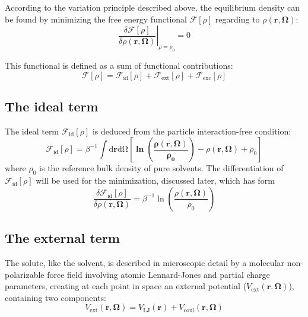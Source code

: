 According to the variation principle described above, the equilibrium
density can be found by minimizing the free energy functional $\mathcal{F}[\rho]$
regarding to $\rho(\mathbf{r},\mathbf{\Omega})$:
\begin{equation}
\left.\frac{\delta\mathcal{F}[\rho]}{\delta\rho(\mathbf{r},\mathbf{\Omega})}\right|_{\rho=\rho_{0}}=0
\end{equation}

This functional is defined as a sum of functional contributions:
\begin{equation}
\mathcal{F}[\rho]=\mathcal{F}_{\mathrm{id}}[\rho]+\mathcal{F}_{\mathrm{ext}}[\rho]+\mathcal{F}_{\mathrm{exc}}[\rho]\label{eq:fff}
\end{equation}


\subsection{The ideal term}

The ideal term $\mathcal{F}_{\mathrm{id}}[\rho]$ is deduced from
the particle interaction-free condition: 
\begin{equation}
\mathcal{F}_{\mathrm{id}}[\rho]=\beta^{-1}\int\mathrm{d}\mathbf{r}\mathrm{d\Omega}\left[\mathbf{\mathbf{\ln\left(\frac{\rho(\mathbf{r},\mathbf{\mathbf{\mathbf{\mathbf{\Omega}}}})}{\rho_{0}}\right)}}-\rho(\mathbf{r},\mathbf{\mathbf{\mathbf{\Omega}}})+\rho_{0}\right]
\end{equation}
where $\rho_{0}$ is the reference bulk density of pure solvents. The
differentiation of $\mathcal{F}_{\mathrm{id}}[\rho]$ will be used
for the minimization, discussed later, which has form
\begin{equation}
\frac{\delta\mathcal{F}_{\mathrm{id}}[\rho]}{\delta\rho(\mathbf{r},\mathbf{\Omega})}=\beta^{-1}\ln\left(\dfrac{\rho(\mathbf{r},\mathbf{\Omega})}{\rho_{0}}\right)
\end{equation}


\subsection{The external term}

The solute, like the solvent, is described in microscopic detail by
a molecular non-polarizable force field involving atomic Lennard-Jones
and partial charge parameters, creating at each point in space an
external potential ($V_{\mathrm{ext}}(\mathbf{r},\mathbf{\mathbf{\mathbf{\mathbf{\Omega}}}})$),
containing two components:
\begin{equation}
V_{\mathrm{ext}}(\mathbf{r},\mathbf{\Omega})=V_{\mathrm{LJ}}(\mathbf{r})+V_{\mathrm{coul}}(\mathbf{r},\mathbf{\Omega})
\end{equation}

